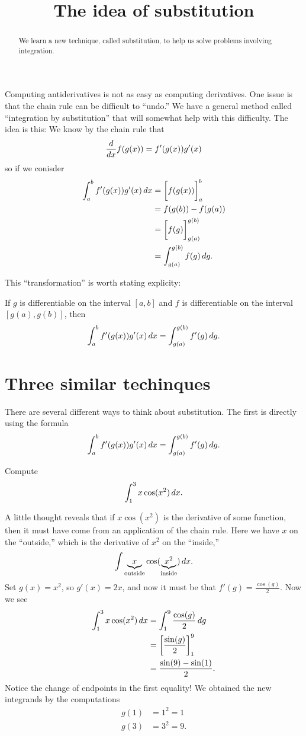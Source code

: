 \documentclass{ximera}
\title[Dig-In:]{The idea of substitution}
\begin{document}
\begin{abstract}
  We learn a new technique, called substitution, to help us solve
  problems involving integration.
\end{abstract}
\maketitle


Computing antiderivatives is not as easy as computing derivatives.
One issue is that the chain rule can be difficult to ``undo.''  We
have a general method called ``integration by substitution'' that will
somewhat help with this difficulty. The idea is this: We know by the
chain rule that
\[
\frac{d}{dx} f(g(x)) = f'(g(x))g'(x)
\]
so if we conisder
\begin{align*}
  \int_a^b f'(g(x))g'(x) \,d x &= \bigg[ f(g(x)) \bigg]_a^b \\
  &= f(g(b)) - f(g(a)) \\
  &= \bigg[ f(g) \bigg]_{g(a)}^{g(b)}\\
  &= \int_{g(a)}^{g(b)}f(g) \,d g.
\end{align*}

This ``transformation'' is worth stating explicity:

\begin{theorem} 
If $g$ is differentiable on the interval $[a,b]$ and $f$ is
differentiable on the interval $[g(a),g(b)]$, then
\[
\int_a^b f'(g(x)) g'(x) \,d x =\int_{g(a)}^{g(b)} f'(g) \,d g.
\]
\end{theorem}

\section{Three similar techinques}

There are several different ways to think about substitution. The
first is directly using the formula
\[
\int_a^b f'(g(x)) g'(x) \,d x = \int_{g(a)}^{g(b)} f'(g) \,d g.
\]
\begin{example}
Compute
\[
\int_1^3 x\cos(x^2)\,d x.
\]
\begin{explanation}
A little thought reveals that if $x\cos(x^2)$ is the derivative of
some function, then it must have come from an application of the chain
rule. Here we have $x$ on the ``outside,'' which is the derivative of
$x^2$ on the ``inside,'' 
\[
\int \underbrace{x}_{\text{outside}}\cos(\underbrace{x^2}_{\text{inside}})\,d x.
\]
Set $g(x) = x^2$, so $g'(x) = 2x$, and now it must be that $f'(g) =
\frac{\cos(g)}{2}$. Now we see
\begin{align*}
\int_1^3 x\cos(x^2)\,d x &= \int_1^9 \frac{\cos(g)}{2}\,d g\\
&= \bigg[ \frac{\sin(g)}{2} \bigg]_1^9 \\
&= \frac{\sin(9) -\sin(1)}{2}.
\end{align*}
Notice the change of endpoints in the first equality!  
We obtained the new integrands by the computations
\begin{align*}
g(1) &= 1^2 = 1  \\
g(3) &= 3^2 = 9.
\end{align*}
\end{explanation}
\end{example}
\end{document}
